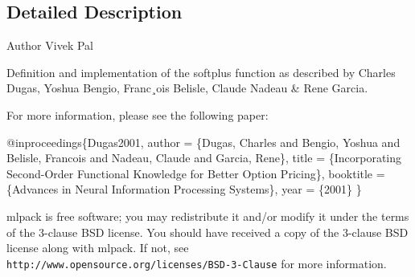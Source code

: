 \subsection{Detailed Description}
\begin{DoxyAuthor}{Author}
Vivek Pal
\end{DoxyAuthor}
Definition and implementation of the softplus function as described by Charles Dugas, Yoshua Bengio, Franc¸ois Belisle, Claude Nadeau \& Rene Garcia.

For more information, please see the following paper\+:


\begin{DoxyCode}
@inproceedings\{Dugas2001,
  author    = \{Dugas, Charles and Bengio, Yoshua and Belisle, Francois and
               Nadeau, Claude and Garcia, Rene\},
  title     = \{Incorporating Second-Order Functional Knowledge \textcolor{keywordflow}{for} Better
               Option Pricing\},
  booktitle = \{Advances in Neural Information Processing Systems\},
  year      = \{2001\}
\}
\end{DoxyCode}


mlpack is free software; you may redistribute it and/or modify it under the terms of the 3-\/clause B\+SD license. You should have received a copy of the 3-\/clause B\+SD license along with mlpack. If not, see {\tt http\+://www.\+opensource.\+org/licenses/\+B\+S\+D-\/3-\/\+Clause} for more information. 